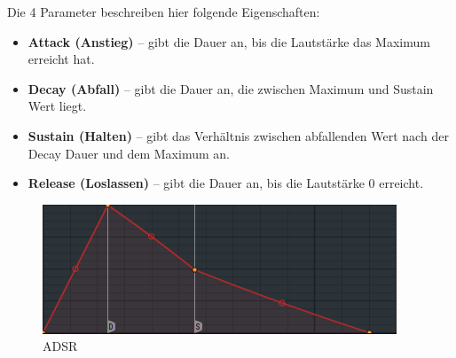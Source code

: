 \bigskip

Die 4 Parameter beschreiben hier folgende Eigenschaften:

\medskip

\begin{itemize}
	\item \textbf{Attack (Anstieg)} -- gibt die Dauer an, bis die Lautstärke das Maximum erreicht hat.
	\item \textbf{Decay (Abfall)} -- gibt die Dauer an, die zwischen Maximum und Sustain Wert liegt.
	\item \textbf{Sustain (Halten)} -- gibt das Verhältnis zwischen abfallenden Wert nach der Decay Dauer und dem Maximum an.
	\item \textbf{Release (Loslassen)} -- gibt die Dauer an, bis die Lautstärke 0 erreicht.
\end{itemize}


\bigskip

\begin{figure}[htbp] \centering
	\includegraphics[width=.95\linewidth]{images/ADSR.png}
	\caption{ADSR}
	\label{ADSR}
\end{figure}


